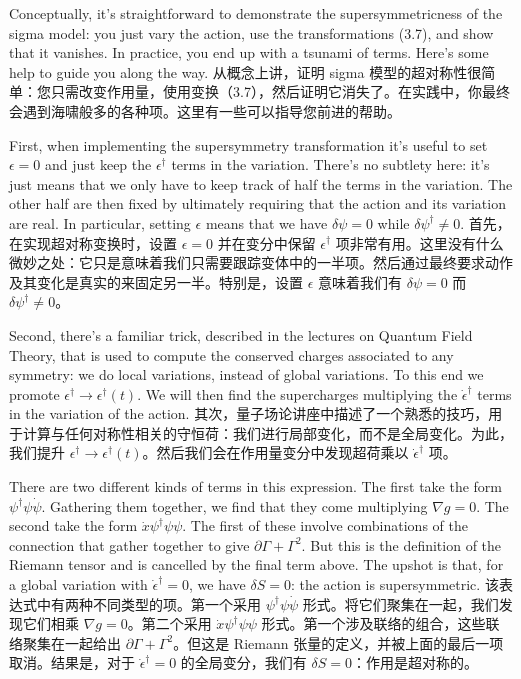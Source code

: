 \documentclass{article}
\begin{document}
\begin{paracol}{2}
Conceptually, it’s straightforward to demonstrate the supersymmetricness of the sigma model: you just vary the action, use the transformations (3.7), and show that it vanishes. In practice, you end up with a tsunami of terms. Here’s some help to guide you along the way.
\switchcolumn
从概念上讲，证明 sigma 模型的超对称性很简单：您只需改变作用量，使用变换（3.7），然后证明它消失了。在实践中，你最终会遇到海啸般多的各种项。这里有一些可以指导您前进的帮助。
\switchcolumn*

First, when implementing the supersymmetry transformation it’s useful to set $\epsilon = 0$ and just keep the $\epsilon^{\dagger}$ terms in the variation. There’s no subtlety here: it’s just means that we only have to keep track of half the terms in the variation. The other half are then fixed by ultimately requiring that the action and its variation are real. In particular, setting $\epsilon$ means that we have $\delta \psi = 0$ while $\delta \psi^{\dagger} \neq 0$.
\switchcolumn
首先，在实现超对称变换时，设置 $\epsilon = 0$ 并在变分中保留 $\epsilon^{\dagger}$ 项非常有用。这里没有什么微妙之处：它只是意味着我们只需要跟踪变体中的一半项。然后通过最终要求动作及其变化是真实的来固定另一半。特别是，设置 $\epsilon$ 意味着我们有 $\delta \psi = 0$ 而 $\delta \psi^{\dagger} \neq 0$。
\switchcolumn*

Second, there’s a familiar trick, described in the lectures on Quantum Field Theory, that is used to compute the conserved charges associated to any symmetry: we do local variations, instead of global variations. To this end we promote $\epsilon^{\dagger} \to \epsilon^{\dagger}(t)$. We will then find the supercharges multiplying the $\dot{\epsilon}^{\dagger}$ terms in the variation of the action.
\switchcolumn
其次，量子场论讲座中描述了一个熟悉的技巧，用于计算与任何对称性相关的守恒荷：我们进行局部变化，而不是全局变化。为此，我们提升 $\epsilon^{\dagger} \to \epsilon^{\dagger}(t)$。然后我们会在作用量变分中发现超荷乘以 $\dot{\epsilon}^{\dagger}$ 项。
\switchcolumn*

There are two different kinds of terms in this expression. The first take the form $\psi^{\dagger} \psi \dot{\psi}$. Gathering them together, we find that they come multiplying $\nabla g = 0$. The second take the form $\dot{x} \psi^{\dagger} \psi \psi$. The first of these involve combinations of the connection that gather together to give $\partial \Gamma + \Gamma^2$. But this is the definition of the Riemann tensor and is cancelled by the final term above. The upshot is that, for a global variation with $\dot{\epsilon}^{\dagger} = 0$, we have $\delta S = 0$: the action is supersymmetric.
\switchcolumn
该表达式中有两种不同类型的项。第一个采用 $\psi^{\dagger} \psi \dot{\psi}$ 形式。将它们聚集在一起，我们发现它们相乘 $\nabla g = 0$。第二个采用 $\dot{x} \psi^{\dagger} \psi \psi$ 形式。第一个涉及联络的组合，这些联络聚集在一起给出 $\partial \Gamma + \Gamma^2$。但这是 Riemann 张量的定义，并被上面的最后一项取消。结果是，对于 $\dot{\epsilon}^{\dagger} = 0$ 的全局变分，我们有 $\delta S = 0$：作用是超对称的。
\switchcolumn*


\end{paracol}
\end{document}
